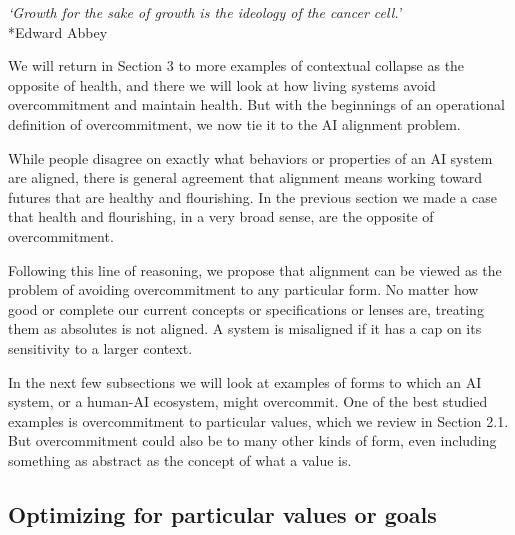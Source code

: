 \documentclass[12pt]{article}
\begin{document}
\begin{center}
\textit{`Growth for the sake of growth is the ideology of the cancer cell.'}\\*Edward Abbey
\end{center}

We will return in Section 3 to more examples of contextual collapse as the opposite of health, and there we will look at how living systems avoid overcommitment and maintain health. But with the beginnings of an operational definition of overcommitment, we now tie it to the AI alignment problem. 

While people disagree on exactly what behaviors or properties of an AI system are aligned, there is general agreement that alignment means working toward futures that are healthy and flourishing. In the previous section we made a case that health and flourishing, in a very broad sense, are the opposite of overcommitment. 

Following this line of reasoning, we propose that alignment can be viewed as the problem of avoiding overcommitment to any particular form. No matter how good or complete our current concepts or specifications or lenses are, treating them as absolutes is not aligned. A system is misaligned if it has a cap on its sensitivity to a larger context. 

In the next few subsections we will look at examples of forms to which an AI system, or a human-AI ecosystem, might overcommit. One of the best studied examples is overcommitment to particular values, which we review in Section 2.1. But overcommitment could also be to many other kinds of form, even including something as abstract as the concept of what a value is.



\subsection{Optimizing for particular values or goals}

\end{document}
